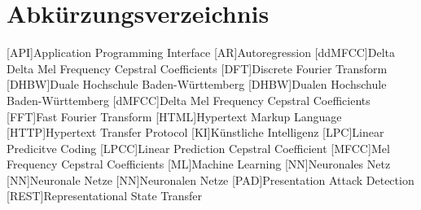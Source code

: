 \section*{Abkürzungsverzeichnis}
\begin{acronym}
  [API]{Application Programming Interface}
  [AR]{Autoregression}
  [ddMFCC]{Delta Delta Mel Frequency Cepstral Coefficients}
  [DFT]{Discrete Fourier Transform}
  [DHBW]{Duale Hochschule Ba\-den-\-Würt\-tem\-berg}
  [DHBW]{Dualen Hochschule Ba\-den-\-Würt\-tem\-berg}
  [dMFCC]{Delta Mel Frequency Cepstral Coefficients}
  [FFT]{Fast Fourier Transform}
  [HTML]{Hypertext Markup Language}
  [HTTP]{Hypertext Transfer Protocol}
  [KI]{Künstliche Intelligenz}
  [LPC]{Linear Predicitve Coding}
  [LPCC]{Linear Prediction Cepstral Coefficient}
  [MFCC]{Mel Frequency Cepstral Coefficients}
  [ML]{Machine Learning}
  [NN]{Neuronales Netz}
  [NN]{Neuronale Netze}
  [NN]{Neuronalen Netze}
  [PAD]{Presentation Attack Detection}
  [REST]{Representational State Transfer}

\end{acronym}
\newpage